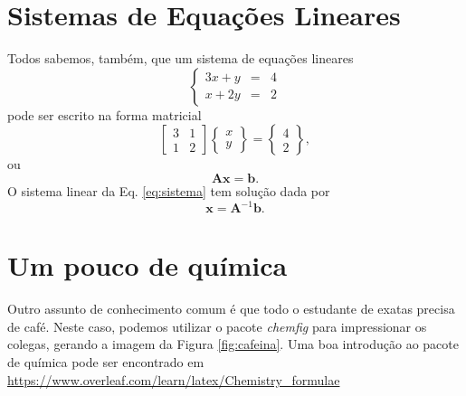 \documentclass{article}
\begin{document}
\section{Sistemas de Equações Lineares}
Todos sabemos, também, que um sistema de equações lineares
%
%
\begin{equation}
    \left \lbrace
    \begin{array}{ccc}
    3x + y & = &4 \\
    x + 2y & = & 2
    \end{array}
    \right .
\end{equation}
pode ser escrito na forma matricial
%
%
\begin{equation}\label{eq:sistema}
    \begin{bmatrix}
        3 & 1 \\
        1 & 2
    \end{bmatrix}\begin{Bmatrix}
        x \\
        y
    \end{Bmatrix} = \begin{Bmatrix}
        4 \\
        2
    \end{Bmatrix},
\end{equation}
ou 
\begin{equation}
    \mathbf{A}\mathbf{x}=\mathbf{b}.
\end{equation}
O sistema linear da Eq. \ref{eq:sistema} tem solução dada por
\begin{equation}
    \mathbf{x}=\mathbf{A}^{-1}\mathbf{b}.
\end{equation}
\section{Um pouco de química}
Outro assunto de conhecimento comum é que todo o estudante de exatas precisa de café. Neste caso, podemos utilizar o pacote \textit{chemfig} para impressionar os colegas, gerando a imagem da Figura \ref{fig:cafeina}. Uma boa introdução ao pacote de química pode ser encontrado em \href{https://www.overleaf.com/learn/latex/Chemistry_formulae}{https://www.overleaf.com/learn/latex/Chemistry\_formulae}
%
%
\end{document}
